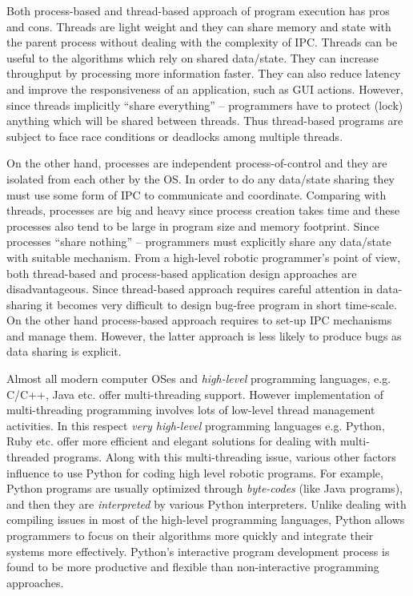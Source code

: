 Both process-based and thread-based approach of  program execution has pros and cons. Threads are light weight and they can share memory and state with the parent process without dealing with the complexity of IPC.   Threads can be useful to the algorithms which rely on shared data/state. They can increase throughput by processing more information faster. They can also reduce latency and improve the responsiveness of an application, such as GUI actions. However, since threads  implicitly ``share everything'' – programmers have to protect (lock) anything which will be
shared between threads. Thus thread-based programs are subject to face race conditions or deadlocks among multiple threads.

On the other hand, processes are independent process-of-control and they are isolated from each other by the OS. In order to do any data/state sharing they must use some form of IPC to communicate and coordinate. Comparing with threads, processes are big and heavy since process creation takes time and these processes also tend to be large in program size and memory footprint.  Since processes ``share nothing'' -- programmers must explicitly share any data/state with suitable mechanism. From a high-level robotic programmer's point of view, both thread-based and process-based application design approaches are disadvantageous. Since thread-based approach requires careful attention in data-sharing it becomes very difficult to design bug-free program in short time-scale. On the other hand process-based approach requires to set-up IPC mechanisms and manage them. However, the latter approach is less likely to produce bugs as data sharing is explicit.
 
Almost all modern computer OSes and {\em high-level} programming languages, e.g. C/C++, Java etc. offer multi-threading support. However implementation of multi-threading programming involves lots of low-level thread management activities. In this respect {\em very high-level} programming languages e.g. Python, Ruby etc. offer more efficient and elegant solutions for dealing with multi-threaded programs. Along with this multi-threading issue, various other factors influence to use Python for coding high level robotic programs. For example, Python programs are  usually optimized through {\em byte-codes} (like Java programs), and then they are {\em interpreted} by various Python interpreters. Unlike dealing with compiling issues in most of the high-level programming languages, Python allows programmers to focus on their  algorithms more quickly and integrate their systems more effectively. Python's interactive program development process is found to be more productive and flexible than non-interactive programming approaches.

